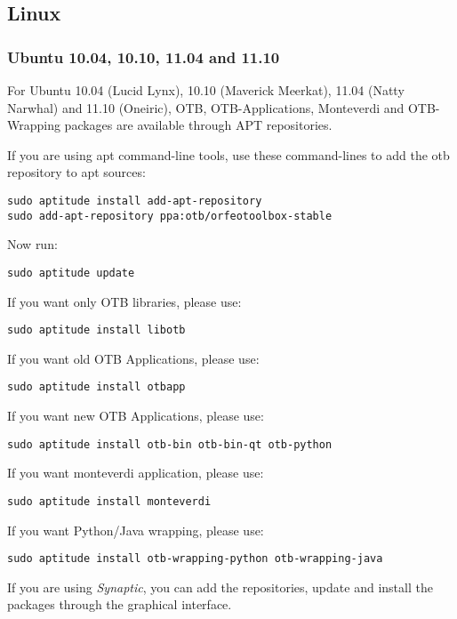\subsection{Linux}

\subsubsection{Ubuntu 10.04, 10.10, 11.04 and 11.10}
\label{ssec:ubuntu_binaries}
For Ubuntu 10.04 (Lucid Lynx), 10.10 (Maverick Meerkat), 11.04 (Natty Narwhal) and 11.10 (Oneiric), OTB, 
OTB-Applications, Monteverdi and OTB-Wrapping packages are available through APT repositories.

If you are using apt command-line tools, use these command-lines to add the otb repository to apt sources:
\begin{verbatim}
sudo aptitude install add-apt-repository 
sudo add-apt-repository ppa:otb/orfeotoolbox-stable
\end{verbatim}
Now run:
\begin{verbatim}
sudo aptitude update
\end{verbatim}
If you want only OTB libraries, please use:
\begin{verbatim}
sudo aptitude install libotb
\end{verbatim}

If you want old OTB Applications, please use:
\begin{verbatim}
sudo aptitude install otbapp
\end{verbatim}

If you want new OTB Applications, please use:
\begin{verbatim}
sudo aptitude install otb-bin otb-bin-qt otb-python
\end{verbatim}

If you want monteverdi application, please use:
\begin{verbatim}
sudo aptitude install monteverdi
\end{verbatim}

If you want Python/Java wrapping, please use:
\begin{verbatim}
sudo aptitude install otb-wrapping-python otb-wrapping-java
\end{verbatim}

If you are using \emph{Synaptic}, you can add the repositories, update and install the packages through the
graphical interface.

